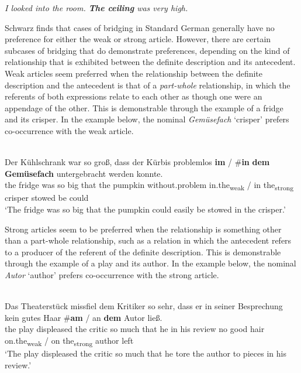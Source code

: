 \documentclass[output=paper,modfonts,nonflat]{langsci/langscibook}
\begin{document}
\ea \label{ex:cisneros:12}
\textit{I looked into the room.  \textbf{The ceiling} was very high.} \citep[171]{Clark1975}
\z 

Schwarz finds that cases of bridging in Standard German generally have no preference for either the weak or strong article.  However, there are certain subcases of bridging that do demonstrate preferences, depending on the kind of relationship that is exhibited between the definite description and its antecedent.  Weak articles seem preferred when the relationship between the definite description and the antecedent is that of a \textit{part-whole} relationship, in which the referents of both expressions relate to each other as though one were an appendage of the other.  This is demonstrable through the example of a fridge and its crisper.  In the example below, the nominal \emph{Gem\"usefach} `crisper' prefers co-occurrence with the weak article.

\ea \label{ex:cisneros:13}
 \\
\gll
Der K\"uhlschrank war so groß, dass der K\"urbis problemlos \textbf{im} \textnormal{/} \textnormal{\#}\textbf{in} \textbf{dem} \textbf{Gem\"usefach} untergebracht werden konnte.\\
the fridge was so big that the pumpkin without.problem in.the\textsubscript{weak} / \phantom{\#}in the\textsubscript{strong} crisper stowed be could\\
\glt
`The fridge was so big that the pumpkin could easily be stowed in the crisper.'
\z

Strong articles seem to be preferred when the relationship is something other than a part-whole relationship, such as a relation in which the antecedent refers to a producer of the referent of the definite description.  This is demonstrable through the example of a play and its author.  In the example below, the nominal \textit{Autor} `author' prefers co-occurrence with the strong article.

\ea \label{ex:cisneros:14}
 \\
\gll
Das Theaterst\"uck missfiel dem Kritiker so sehr, dass er in seiner Besprechung kein gutes Haar \#\textbf{am} \textnormal{/} an \textbf{dem} Autor ließ.\\
the play displeased the critic so much that he in his review no good hair \phantom{\#}on.the\textsubscript{weak} / on the\textsubscript{strong} author left\\
\glt
`The play displeased the critic so much that he tore the author to pieces in his review.'
\z 
\end{document}
